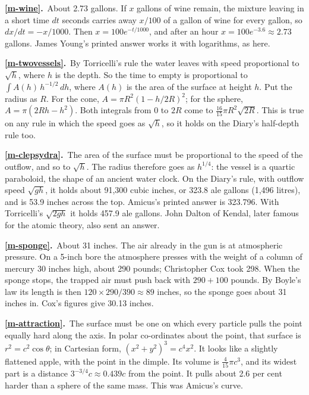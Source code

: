 \documentclass[11pt,a4paper]{article}
\newcommand{\ans}[2]{\par\smallskip\noindent\textbf{\ref{#1}.}\ #2}
\begin{document}
\ans{m-wine}{About 2.73 gallons. If $x$ gallons of wine remain, the mixture leaving in a
short time $dt$ seconds carries away $x/100$ of a gallon of wine for every gallon, so
$dx/dt = -x/1000$. Then $x = 100e^{-t/1000}$, and after an hour $x = 100e^{-3.6}\approx2.73$
gallons. James Young's printed answer works it with logarithms, as here.}

\ans{m-twovessels}{By Torricelli's rule the water leaves with speed proportional to
$\sqrt h$, where $h$ is the depth. So the time to empty is proportional to
$\int A(h)\,h^{-1/2}\,dh$, where $A(h)$ is the area of the surface at height $h$. Put the
radius as $R$. For the cone, $A = \pi R^2(1 - h/2R)^2$; for the sphere,
$A = \pi(2Rh - h^2)$. Both integrals from 0 to $2R$ come to $\tfrac{16}{15}\pi R^2\sqrt{2R}$.
This is true on any rule in which the speed goes as $\sqrt h$, so it holds on the Diary's
half-depth rule too.}

\ans{m-clepsydra}{The area of the surface must be proportional to the speed of the
outflow, and so to $\sqrt h$. The radius therefore goes as $h^{1/4}$: the vessel is a
quartic paraboloid, the shape of an ancient water clock. On the Diary's rule, with
outflow speed $\sqrt{gh}$, it holds about 91,300 cubic inches, or 323.8 ale gallons (1,496
litres), and is 53.9 inches across the top. Amicus's printed answer is 323.796. With
Torricelli's $\sqrt{2gh}$ it holds 457.9 ale gallons. John Dalton of Kendal, later famous
for the atomic theory, also sent an answer.}

\ans{m-sponge}{About 31 inches. The air already in the gun is at atmospheric pressure. On
a 5-inch bore the atmosphere presses with the weight of a column of mercury 30 inches
high, about 290 pounds; Christopher Cox took 298. When the sponge stops, the trapped air
must push back with $290 + 100$ pounds. By Boyle's law its length is then
$120\times290/390\approx89$ inches, so the sponge goes about 31 inches in. Cox's figures
give 30.13 inches.}

\ans{m-attraction}{The surface must be one on which every particle pulls the point
equally hard along the axis. In polar co-ordinates about the point, that surface is
$r^2 = c^2\cos\theta$; in Cartesian form, $(x^2+y^2)^3 = c^4x^2$. It looks like a
slightly flattened apple, with the point in the dimple. Its volume is $\tfrac4{15}\pi c^3$,
and its widest part is a distance $3^{-3/4}c\approx0.439c$ from the point. It pulls about
2.6 per cent harder than a sphere of the same mass. This was Amicus's curve.}
\end{document}
